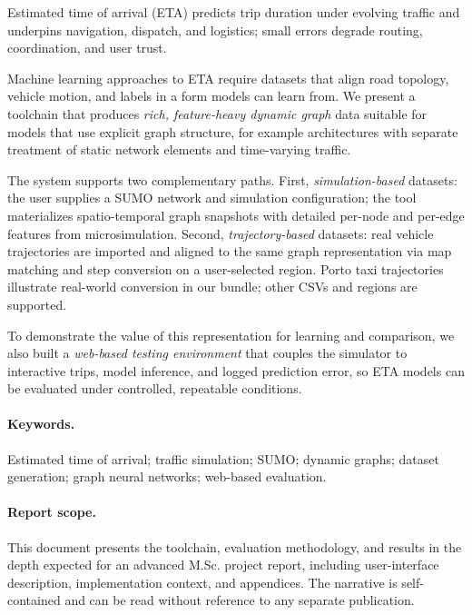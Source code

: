 Estimated time of arrival (ETA) predicts trip duration under evolving traffic and underpins navigation, dispatch, and logistics; small errors degrade routing, coordination, and user trust.

Machine learning approaches to ETA require datasets that align road topology, vehicle motion, and labels in a form models can learn from.
We present a toolchain that produces \emph{rich, feature-heavy dynamic graph} data suitable for models that use explicit graph structure, for example architectures with separate treatment of static network elements and time-varying traffic.

The system supports two complementary paths.
First, \emph{simulation-based} datasets: the user supplies a SUMO network and simulation configuration; the tool materializes spatio-temporal graph snapshots with detailed per-node and per-edge features from microsimulation.
Second, \emph{trajectory-based} datasets: real vehicle trajectories are imported and aligned to the same graph representation via map matching and step conversion on a user-selected region.
Porto taxi trajectories illustrate real-world conversion in our bundle; other CSVs and regions are supported.

To demonstrate the value of this representation for learning and comparison, we also built a \emph{web-based testing environment} that couples the simulator to interactive trips, model inference, and logged prediction error, so ETA models can be evaluated under controlled, repeatable conditions.

\paragraph{Keywords.}
\begin{sloppypar}
Estimated time of arrival; traffic simulation; SUMO; dynamic graphs; dataset generation; graph neural networks; web-based evaluation.
\end{sloppypar}

\paragraph{Report scope.}
This document presents the toolchain, evaluation methodology, and results in the depth expected for an advanced M.Sc. project report, including user-interface description, implementation context, and appendices. The narrative is self-contained and can be read without reference to any separate publication.
